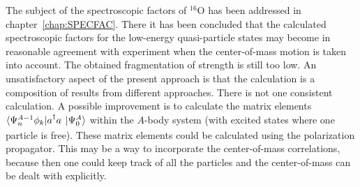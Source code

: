 The subject of the spectroscopic factors of $^{16}$O has been addressed in
chapter~\ref{chap:SPECFAC}. There it has been concluded that the calculated
spectroscopic factors for the low-energy quasi-particle states
may become
in reasonable agreement with experiment when the center-of-mass motion 
is taken into account. 
The obtained fragmentation of strength is still too low.
An  unsatisfactory aspect of the present approach is that 
the calculation is a composition of results from different approaches. 
There is not one consistent
calculation. A possible improvement is to  calculate  
the matrix elements $\ME< \Psi^{A-1}_n \phi_k|\Oc{ }\Oa{ } |\Psi^A_0>$
within the $A$-body system (with excited states where one particle
is free). These matrix elements could be calculated using the 
polarization propagator. 
This may be a way to incorporate the center-of-mass correlations, because then
one could keep track of all the particles and the center-of-mass can be dealt 
with explicitly.

